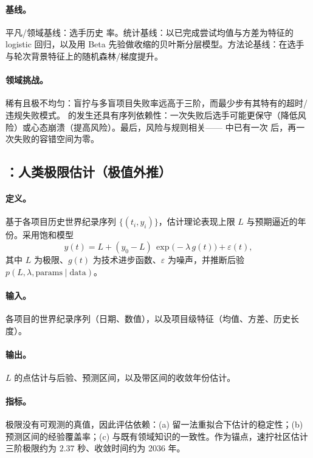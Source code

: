 \paragraph{基线。}平凡/领域基线：选手历史 \DNF{} 率。统计基线：以已完成尝试均值与方差为特征的 logistic 回归，以及用 Beta 先验做收缩的贝叶斯分层模型。方法论基线：在选手与轮次背景特征上的随机森林/梯度提升。

\paragraph{领域挑战。}\DNF{} 稀有且极不均匀：盲拧与多盲项目失败率远高于三阶，而最少步有其特有的超时/违规失败模式。\DNF{} 的发生还具有序列依赖性：一次失败后选手可能更保守（降低风险）或心态崩溃（提高风险）。最后，风险与规则相关—— 中已有一次 \DNF{} 后，再一次失败的容错空间为零。

\subsection{：人类极限估计（极值外推）}
\label{sec:task4}

\paragraph{定义。}基于各项目历史世界纪录序列 $\{(t_i, y_i)\}$，估计理论表现上限 $L$ 与预期逼近的年份。采用饱和模型
\begin{equation}
  y(t) = L + (y_0 - L)\,\exp\!\big(-\lambda\, g(t)\big) + \varepsilon(t),
  \label{eq:limit}
\end{equation}
其中 $L$ 为极限、$g(t)$ 为技术进步函数、$\varepsilon$ 为噪声，并推断后验 $p(L, \lambda, \text{params} \mid \text{data})$。

\paragraph{输入。}各项目的世界纪录序列（日期、数值），以及项目级特征（均值、方差、历史长度）。

\paragraph{输出。}$L$ 的点估计与后验、预测区间，以及带区间的收敛年份估计。

\paragraph{指标。}极限没有可观测的真值，因此评估依赖：(a) 留一法重拟合下估计的稳定性；(b) 预测区间的经验覆盖率；(c) 与既有领域知识的一致性。作为锚点，速拧社区估计三阶极限约为 $2.37$ 秒、收敛时间约为 2036 年。

